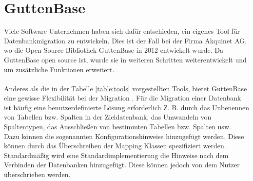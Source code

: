 \section{GuttenBase}
\label{section:grundlagen:gb}
Viele Software Unternehmen haben sich dafür entschieden, ein eigenes Tool für Datenbankmigration zu entwickeln. Dies ist der Fall bei der Firma Akquinet AG, wo die Open Source Bibliothek GuttenBase in 2012 entwickelt wurde. Da GuttenBase open source ist, wurde sie in weiteren Schritten weiterentwickelt und um zusätzliche Funktionen erweitert.\\ \\
Anderes als die in der Tabelle \ref{table:tools} vorgestellten Tools, bietet GuttenBase eine gewisse Flexibilität bei der Migration
.
Für die Migration einer Datenbank ist häufig eine benutzerdefinierte Lösung erforderlich Z. B. durch das Unbenennen von Tabellen bzw. Spalten in der Zieldatenbank, das Umwandeln von Spaltentypen, das Ausschließen von bestimmten Tabellen bzw. Spalten usw. \\

Dazu können die sogenannten Konfigurationshinweise hinzugefügt werden. Diese können durch das Überschreiben der Mapping Klassen spezifiziert werden. Standardmäßig wird eine Standardimplementierung die Hinweise nach dem Verbinden der Datenbanken hinzugefügt. Diese können jedoch von dem Nutzer überschrieben werden. 




